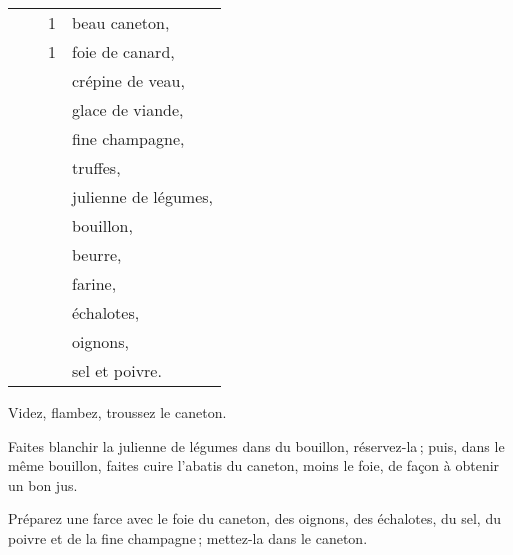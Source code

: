\footnotesize
\begin{longtable}{rrrp{16em}}
        &         &  1 & beau caneton,                                                                    \\
        &         &  1 & foie de canard,                                                                  \\
        &         &    & crépine de veau,                                                                 \\
        &         &    & glace de viande,                                                                 \\
        &         &    & fine champagne,                                                                  \\
        &         &    & truffes,                                                                         \\
        &         &    & julienne de légumes,                                                             \\
        &         &    & bouillon,                                                                        \\
        &         &    & beurre,                                                                          \\
        &         &    & farine,                                                                          \\
        &         &    & échalotes,                                                                       \\
        &         &    & oignons,                                                                         \\
        &         &    & sel et poivre.                                                                   \\
\end{longtable}
\normalsize

Videz, flambez, troussez le caneton.

Faites blanchir la julienne de légumes dans du bouillon, réservez-la ; puis,
dans le même bouillon, faites cuire l'abatis du caneton, moins le foie, de
façon à obtenir un bon jus.

Préparez une farce avec le foie du caneton, des oignons, des échalotes, du sel,
du poivre et de la fine champagne ; mettez-la dans le caneton.


